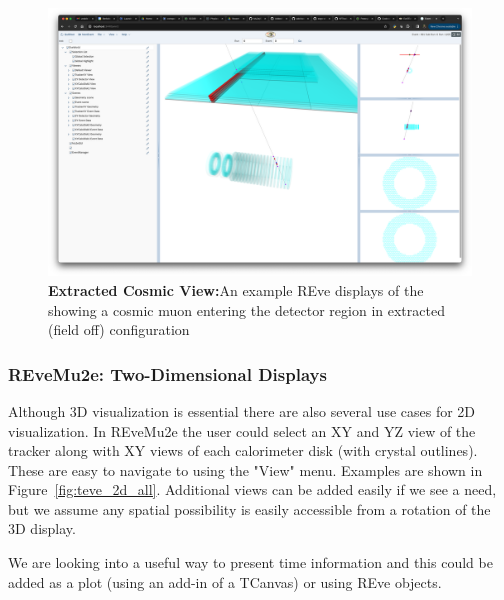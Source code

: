  \begin{figure}[htb]
\begin{center}
\includegraphics[width=0.9\linewidth]{figures/extracted.png}
\caption{\textbf{Extracted Cosmic View:}An example REve displays of the showing a cosmic muon entering the detector region in extracted (field off) configuration}
\label{fig:teve_3D_extracted}
\end{center}
\end{figure}

\subsubsection{REveMu2e: Two-Dimensional Displays}


Although 3D visualization is essential there are also several use cases for 2D visualization. In REveMu2e the user could select an XY and YZ view of the tracker along with XY views of each calorimeter disk (with crystal outlines). These are easy to navigate to using the "View" menu. Examples are shown in Figure~\ref{fig:teve_2d_all}. Additional views can be added easily if we see a need, but we assume any spatial possibility is easily accessible from a rotation of the 3D display.

We are looking into a useful way to present time information and this could be added as a plot (using an add-in of a TCanvas) or using REve objects.

